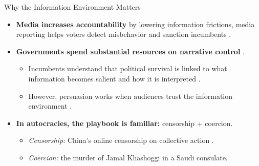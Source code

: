 \documentclass[10pt,aspectratio=169]{beamer}
\begin{document}
\begin{frame}{Why the Information Environment Matters}
\begin{itemize}
    \setlength\itemsep{0.65em}

    \item \textbf{Media increases accountability}
    by lowering information frictions, media reporting helps voters \alert{detect} misbehavior and \alert{sanction} incumbents {\footnotesize\color{gray}\citep{Audits-Ferraz-QJE}}.

\item \textbf{Governments spend substantial resources on narrative control} {\footnotesize\color{gray}\citep{ArgCorr-DiTella-AEJAE, MediaCaptures-Zeidl-Econometrica, CensorshipChina-King-Science}}.

    \begin{itemize}
        \item Incumbents understand that
    political survival is linked to what information becomes \alert{salient} and how it is interpreted {\footnotesize\color{gray}\citep{Autocracy-Guriev-JPE}}.
    \item However, persuasion works when \alert{audiences
trust} the information environment {\footnotesize\color{gray}\citep{MediaBias-Gentzkow-JPE}}.
    \end{itemize}
    

    \item \textbf{In autocracies, the playbook is familiar:} \alert{censorship} + \alert{coercion}.
    \begin{itemize}
        \item \textit{Censorship:} China’s online censorship on collective action {\footnotesize\color{gray}\citep{CensorshipCollective-King-APSR}}.
        \item \textit{Coercion:} the murder of Jamal Khashoggi in a Saudi consulate.
    \end{itemize}
\end{itemize}
\end{frame}
\end{document}
